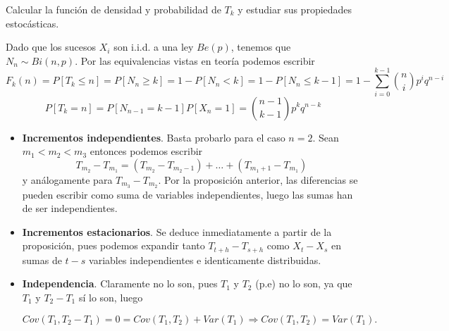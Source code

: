 \documentclass[twoside]{article}
\begin{document}
\begin{ejercicio}{4}
Calcular la función de densidad y probabilidad de $T_k$ y estudiar sus propiedades estocásticas. 
\end{ejercicio}
\begin{solucion}
Dado que los sucesos $X_i$ son i.i.d. a una ley $Be(p)$, tenemos que $N_n \sim Bi(n,p)$. Por las equivalencias vistas en teoría podemos escribir
$$
F_k(n) = P[T_k \leq n ] = P[N_n \geq k] = 1 - P[N_n < k] = 1 - P[N_n \leq k -1] = 1- \sum_{i=0}^{k-1}\binom{n}{i}p^iq^{n-i}
$$
$$
P[T_k = n] = P[N_{n-1} =k-1]P[X_n = 1] = \binom{n-1}{k-1}p^kq^{n-k}
$$
\begin{itemize}
\item \textbf{Incrementos independientes}. Basta probarlo para el caso $n=2$. Sean $m_1 < m_2 < m_3$ entonces podemos escribir
$$
T_{m_2}- T_{m_1}  = (T_{m_2}- T_{m_2-1}) + … + (T_{m_{1}+1}- T_{m_1})
$$
y análogamente para $T_{m_3}- T_{m_2}$. Por la proposición anterior, las diferencias se pueden escribir como suma de variables independientes, luego las sumas han de ser independientes.

\item \textbf{Incrementos estacionarios}. Se deduce inmediatamente a partir de la proposición, pues podemos expandir tanto $T_{t+h}-T_{s+h}$ como $X_t - X_s$ en sumas de $t-s$ variables independientes e identicamente distribuidas.

\item \textbf{Independencia}. Claramente no lo son, pues $T_1$ y $T_2$ (p.e) no lo son, ya que $T_1$ y $T_2-T_1$ sí lo son, luego 

$$
Cov(T_1,T_2-T_1) = 0 = Cov(T_1,T_2) + Var(T_1) \Rightarrow Cov(T_1,T_2) = Var(T_1). 
$$


\end{itemize}
\end{solucion}
\end{document}
